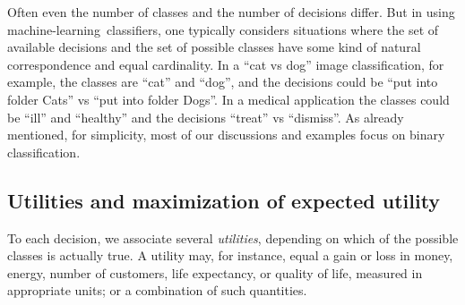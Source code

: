 \documentclass[\ifafour a4paper,12pt,\else a5paper,10pt,\fi%
onecolumn,oneside,article,%
british%
]{memoir}
\theoremstyle{remark}
\theoremstyle{innote}
\renewcommand*{\|}[1][]{\nonscript\:#1\vert\nonscript\:\mathopen{}}
\newcommand*{\ml}{machine-learning}
\begin{document}
Often even the number of classes and the number of decisions differ. But in using \ml\ classifiers, one typically considers situations where the set of available decisions and the set of possible classes have some kind of natural correspondence and equal cardinality. In a \enquote{cat vs dog} image classification, for example, the classes are \enquote{cat} and \enquote{dog}, and the decisions could be \enquote{put into folder Cats} vs \enquote{put into folder Dogs}. In a medical application the classes could be \enquote{ill} and \enquote{healthy} and the decisions \enquote{treat} vs \enquote{dismiss}. As already mentioned, for simplicity, most of our discussions and examples focus on binary classification.


\subsection{Utilities and maximization of expected utility}
\label{sec:dt_utilities}

To each decision, we associate several \emph{utilities}, depending on which of the possible classes is actually true. A utility may, for instance, equal a gain or loss in money, energy, number of customers, life expectancy, or quality of life, measured in appropriate units; or a combination of such quantities.
\end{document}
